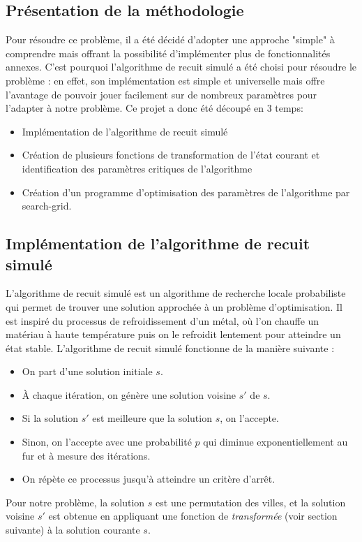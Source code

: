 \documentclass[a4paper, 12pt]{article}
\begin{document}
\subsection{Présentation de la méthodologie}
Pour résoudre ce problème, il a été décidé d'adopter une approche "simple" à comprendre mais offrant la possibilité d'implémenter plus de fonctionnalités annexes.
C'est pourquoi l'algorithme de recuit simulé a été choisi pour résoudre le problème : en effet, son implémentation est simple et universelle mais offre l'avantage de pouvoir jouer
facilement sur de nombreux paramètres pour l'adapter à notre problème.
Ce projet a donc été découpé en 3 temps:
\begin{itemize}
    \item Implémentation de l'algorithme de recuit simulé
    \item Création de plusieurs fonctions de transformation de l'état courant et identification des paramètres critiques de l'algorithme
    \item Création d'un programme d'optimisation des paramètres de l'algorithme par search-grid.
\end{itemize}

\subsection{Implémentation de l'algorithme de recuit simulé}
L'algorithme de recuit simulé est un algorithme de recherche locale probabiliste qui permet de trouver une solution approchée à un problème d'optimisation.
Il est inspiré du processus de refroidissement d'un métal, où l'on chauffe un matériau à haute température puis on le refroidit lentement pour atteindre un état stable.
L'algorithme de recuit simulé fonctionne de la manière suivante :
\begin{itemize}
    \item On part d'une solution initiale $s$.
    \item À chaque itération, on génère une solution voisine $s'$ de $s$.
    \item Si la solution $s'$ est meilleure que la solution $s$, on l'accepte.
    \item Sinon, on l'accepte avec une probabilité $p$ qui diminue exponentiellement au fur et à mesure des itérations.
    \item On répète ce processus jusqu'à atteindre un critère d'arrêt.
\end{itemize}

Pour notre problème, la solution $s$ est une permutation des villes, et la solution voisine $s'$ est obtenue en appliquant une fonction de \textit{transformée} (voir section suivante) à la solution courante $s$.
\end{document}
